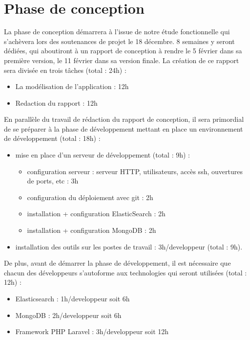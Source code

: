 \section{Phase de conception}

    La phase de conception démarrera à l'issue de notre étude fonctionnelle qui s'achèvera lors des soutenances de projet le 18 décembre.  8 semaines y seront dédiées, qui aboutiront à un rapport de conception à rendre le 5 février dans sa première version, le 11 février dans sa version finale. La création de ce rapport sera divisée en trois tâches (total : 24h) :
\begin{itemize}
\item La modélisation de l'application : 12h
\item Redaction du rapport : 12h
\end{itemize}

    En parallèle du travail de rédaction du rapport de conception, il sera primordial de se préparer à la phase de développement mettant en place un environnement de développement (total : 18h) :
\begin{itemize}
\item mise en place d'un serveur de développement (total : 9h) :
    \begin{itemize}
    \item configuration serveur : serveur HTTP, utilisateurs, accès ssh, ouvertures de ports, etc : 3h
    \item configuration du déploiement avec git : 2h
    \item installation + configuration ElasticSearch : 2h
    \item installation + configuration MongoDB : 2h
    \end{itemize}
\item installation des outils sur les postes de travail : 3h/developpeur (total : 9h).
\end{itemize}

De plus, avant de démarrer la phase de développement, il est nécessaire que chacun des développeurs s'autoforme aux technologies qui seront utilisées (total : 12h) :
\begin{itemize}
\item Elasticsearch : 1h/developpeur soit 6h
\item MongoDB : 2h/developpeur soit 6h
\item Framework PHP Laravel : 3h/developpeur soit 12h
\end{itemize}


